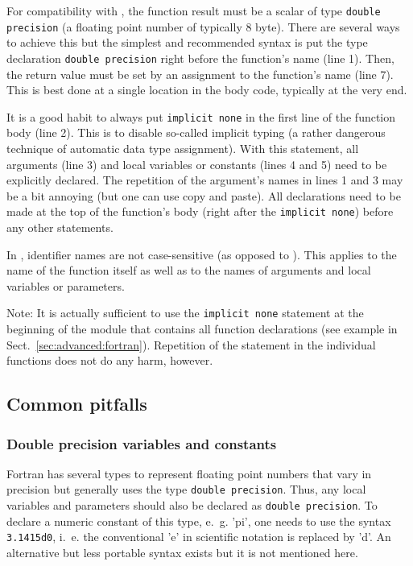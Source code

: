 \documentclass[times,onecolumn]{article}
\begin{document}
For compatibility with , the function result must be a scalar of type \verb|double precision| (a floating point number of typically 8 byte). There are several ways to achieve this but the simplest and recommended syntax is put the type declaration \verb|double precision| right before the function's name (line 1). Then, the return value must be set by an assignment to the function's name (line 7). This is best done at a single location in the body code, typically at the very end.

It is a good habit to always put \verb|implicit none| in the first line of the function body (line 2). This is to disable so-called implicit typing (a rather dangerous technique of automatic data type assignment). With this statement, all arguments (line 3) and local variables or constants (lines 4 and 5) need to be explicitly declared. The repetition of the argument's names in lines 1 and 3 may be a bit annoying (but one can use copy and paste). All declarations need to be made at the top of the function's body (right after the \verb|implicit none|) before any other statements.

In , identifier names are not case-sensitive (as opposed to ). This applies to the name of the function itself as well as to the names of arguments and local variables or parameters.

Note: It is actually sufficient to use the \verb|implicit none| statement at the beginning of the module that contains all function declarations (see example in Sect.~\ref{sec:advanced:fortran}). Repetition of the statement in the individual functions does not do any harm, however. 

\subsection{Common pitfalls}

\subsubsection{Double precision variables and constants}

Fortran has several types to represent floating point numbers that vary in precision but  generally uses the type \verb|double precision|. Thus, any local variables and parameters should also be declared as \verb|double precision|. To declare a numeric constant of this type, e.~g. 'pi', one needs to use the syntax \verb|3.1415d0|, i.~e. the conventional 'e' in scientific notation is replaced by 'd'. An alternative but less portable syntax exists but it is not mentioned here.
\end{document}
